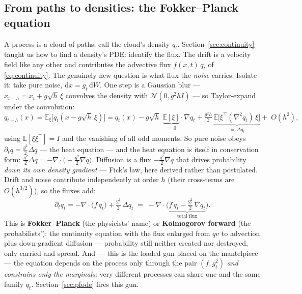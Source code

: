 \documentclass[10pt,a4paper]{article}
\newcommand{\E}{\mathbb{E}}
\newcommand{\dd}{\mathrm{d}}
\begin{document}
\subsection{From paths to densities: the Fokker--Planck equation}
\label{sec:fokker}

A process is a cloud of paths; call the cloud's density $q_t$.
Section~\ref{sec:continuity} taught us how to find a density's PDE:
identify the flux. The drift is a velocity field like any other and
contributes the advective flux $f(x, t)\, q_t$ of \eqref{eq:continuity}.
The genuinely new question is what flux the \emph{noise} carries.
Isolate it: take pure noise, $\dd x = g_t\, \dd W$. One step is a
Gaussian blur --- $x_{t+h} = x_t + g\sqrt{h}\,\xi$ convolves the density
with $\mathcal{N}(0, g^2 h I)$ --- so Taylor-expand under the
convolution:
\begin{equation}
q_{t+h}(x)
= \E_\xi\big[ q_t(x - g\sqrt{h}\,\xi) \big]
= q_t(x)
- g\sqrt{h}\;\underbrace{\E[\xi]}_{=\,0}\!\cdot\nabla q_t
+ \tfrac{g^2 h}{2}\,
\underbrace{\E\big[ \xi^\top (\nabla^2 q_t)\, \xi \big]}_{=\,\Delta q_t}
+ \;O(h^2),
\end{equation}
using $\E[\xi \xi^\top] = I$ and the vanishing of all odd moments. So
pure noise obeys $\partial_t q = \tfrac{g^2}{2} \Delta q$ --- the heat
equation --- and the heat equation is itself in conservation form:
$\tfrac{g^2}{2}\Delta q
= -\nabla\!\cdot\!\big( -\tfrac{g^2}{2} \nabla q \big)$. Diffusion is a
flux $-\tfrac{g^2}{2}\nabla q$ that drives probability \emph{down its
own density gradient} --- Fick's law, here derived rather than
postulated. Drift and noise contribute independently at order $h$
(their cross-terms are $O(h^{3/2})$), so the fluxes add:
\begin{equation}
\boxed{\;\partial_t q_t
= -\nabla\!\cdot\!\big( f\, q_t \big)
+ \tfrac{g_t^2}{2}\, \Delta q_t
\;=\; -\nabla\!\cdot\!\Big( \underbrace{f\, q_t
- \tfrac{g_t^2}{2}\, \nabla q_t}_{\text{total flux}} \Big).\;}
\label{eq:fp-general}
\end{equation}
This is \textbf{Fokker--Planck} (the physicists' name) or
\textbf{Kolmogorov forward} (the probabilists'): the continuity
equation with the flux enlarged from $qv$ to advection plus
down-gradient diffusion --- probability still neither created nor
destroyed, only carried and spread. And --- this is the loaded gun
placed on the mantelpiece --- the equation depends on the process only
through the pair $(f, g_t^2)$ \emph{and constrains only the marginals}:
very different processes can share one and the same family $q_t$.
Section~\ref{sec:pfode} fires this gun.
\end{document}
